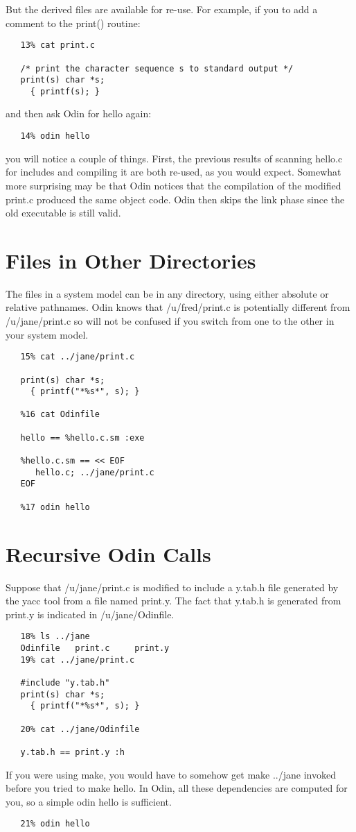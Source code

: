 But the derived files are available for re-use.  For example, if you
to add a comment to the {\ex print()} routine:
\begin{verbatim}
   13% cat print.c

   /* print the character sequence s to standard output */
   print(s) char *s;
     { printf(s); }
\end{verbatim}
and then ask Odin for {\ex hello} again:
\begin{verbatim}
   14% odin hello
\end{verbatim}
you will notice a couple of things.
First, the previous results of scanning {\ex hello.c} for includes
and compiling it are both re-used, as you would expect.
Somewhat more surprising may be that Odin notices that the compilation of
the modified {\ex print.c} produced the same object code.
Odin then skips the link
phase since the old executable is still valid.


\section{Files in Other Directories}

The files in a system model can be in any directory, using either
absolute or relative pathnames.  Odin knows that {\ex /u/fred/print.c} is
potentially different from {\ex /u/jane/print.c} so will not be confused if
you switch from one to the other in your system model.
\begin{verbatim}
   15% cat ../jane/print.c

   print(s) char *s;
     { printf("*%s*", s); }

   %16 cat Odinfile

   hello == %hello.c.sm :exe

   %hello.c.sm == << EOF
      hello.c; ../jane/print.c
   EOF

   %17 odin hello
\end{verbatim}


\section {Recursive Odin Calls}

Suppose that {\ex /u/jane/print.c} is modified to include a {\ex y.tab.h}
file generated by the {\ex yacc} tool from a file named {\ex print.y}.
The fact that {\ex y.tab.h} is generated from {\ex print.y} is indicated
in {\ex /u/jane/Odinfile}.
\begin{verbatim}
   18% ls ../jane
   Odinfile   print.c     print.y
   19% cat ../jane/print.c

   #include "y.tab.h"
   print(s) char *s;
     { printf("*%s*", s); }

   20% cat ../jane/Odinfile

   y.tab.h == print.y :h
\end{verbatim}
If you were using {\ex make}, you would have to somehow get {\ex make ../jane}
invoked before you tried to {\ex make hello}.  In Odin, all these dependencies
are computed for you, so a simple {\ex odin hello} is sufficient.
\begin{verbatim}
   21% odin hello
\end{verbatim}


